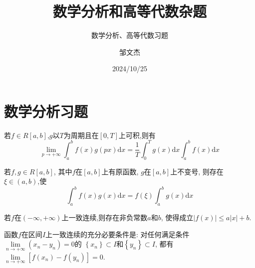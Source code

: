 \documentclass[lang=cn,newtx,10pt,scheme=chinese]{../Template/elegantbook}
\title{数学分析和高等代数杂题}
\subtitle{数学分析、高等代数习题}
\author{邹文杰}
\institute{无}
\date{2024/10/25}
\begin{document}
\maketitle
\frontmatter

\tableofcontents

\mainmatter%


\chapter{数学分析习题}

\begin{lemma}[Riemann 引理] \label{thm:Riemann}
若$f\in R\left[ a,b \right] $,$g$以$T$为周期且在$\left[ 0,T \right] $上可积,则有
\begin{equation}
\underset{p\rightarrow +\infty}{\lim}\int_a^b{f\left( x \right) g\left( px \right) \mathrm{d}x=\frac{1}{T}}\int_0^T{g\left( x \right) \mathrm{d}x}\int_a^b{f\left( x \right) \mathrm{d}x}
\end{equation}
\end{lemma}

\begin{theorem}[积分第一中值定理的推广] \label{thm:JF\mathrm{d}yZZ}
若$f,g\in R\left[ a,b \right] $,
其中$f$在$\left[ a,b \right] $上有原函数,
$g$在$\left[ a,b \right] $上不变号,
则存在$\xi \in \left( a,b \right) $,使
\begin{equation}
\int_a^b{f\left( x \right) g\left( x \right) \mathrm{d}x}=f\left( \xi \right) \int_a^b{g\left( x \right) \mathrm{d}x}
\end{equation}
\end{theorem}

\begin{proposition} \label{pro:YZLXHS}
若$f$在$\left( -\infty ,+\infty \right) $上一致连续,则存在非负常数$a$和$b$,
使得成立$\left| f\left( x \right) \right|\leqslant a\left| x \right|+b$.
\end{proposition}

\begin{proposition} \label{pro:HSYZLXCYTJ}
函数$f$在区间$I$上一致连续的充分必要条件是:
对任何满足条件$\underset{n\rightarrow +\infty}{\lim}\left( x_n-y_n \right) =0$的
$\left\{ x_n \right\} \subset I$和$\left\{ y_n \right\} \subset I$,
都有$\underset{n\rightarrow +\infty}{\lim}\left[ f\left( x_n \right) -f\left( y_n \right) \right] =0$.
\end{proposition}


\newpage
\end{document}
